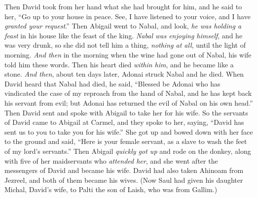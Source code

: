 \begin{biblechapter}
\verse Then David took from her hand what she had brought for him, and he said to her, “Go up to your house in peace. See, I have listened to your voice, and I have \textit{granted your request}.”
\verse Then Abigail went to Nabal, and look, \textit{he was holding a feast} in his house like the feast of the king. \textit{Nabal was enjoying himself}, and he was very drunk, so she did not tell him a thing, \textit{nothing at all}, until the light of morning.
\verse \textit{And then} in the morning when the wine had gone out of Nabal, his wife told him these words. Then his heart died \textit{within him}, and he became like a stone.
\verse \textit{And then}, about ten days later, Adonai struck Nabal and he died.
\verse When David heard that Nabal had died, he said, “Blessed be Adonai who has vindicated the case of my reproach from the hand of Nabal, and he has kept back his servant from evil; but Adonai has returned the evil of Nabal on his own head.” Then David sent and spoke with Abigail to take her for his wife.
\verse So the servants of David came to Abigail at Carmel, and they spoke to her, saying, “David has sent us to you to take you for his wife.”
\verse She got up and bowed down with her face to the ground and said, “Here is your female servant, as a slave to wash the feet of my lord’s servants.”
\verse Then Abigail \textit{quickly got up} and rode on the donkey, along with five of her maidservants who \textit{attended her}, and she went after the messengers of David and became his wife.
\verse David had also taken Ahinoam from Jezreel, and both of them became his wives.
\verse (Now Saul had given his daughter Michal, David’s wife, to Palti the son of Laish, who was from Gallim.)
\end{biblechapter}

